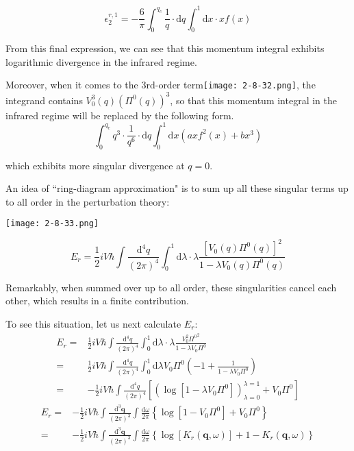 \begin{equation*} \label{Eqs2.8.9.d} \tag{2.8.9.d}
\epsilon_2^{r,1}= -\frac{6}{\pi} \int_0^{q_c} \frac{1}{q} \cdot \mathrm{d} q \int_0^{1} \mathrm{d} x \cdot  x f(x)
\end{equation*}

From this final expression, we can see that this momentum integral exhibits logarithmic divergence in the infrared regime.

Moreover, when it comes to the 3rd-order term\texttt{[image: 2-8-32.png]}, the integrand contains $V_0^3(q) (\Pi^0(q))^3$, so that this momentum integral in the infrared regime will be replaced by the following form.
\begin{equation*} \label{Eqs2.8.9.e} \tag{2.8.9.e}
\int_0^{q_c}q^3 \cdot \frac{1}{q^6} \cdot \mathrm{d}q \int_0^1 \mathrm{d} x \left( a x f^2(x) + bx^3 \right)
\end{equation*}

which exhibits more singular divergence at $q=0$.

An idea of ``ring-diagram approximation" is to sum up all these singular terms up to all order in the perturbation theory:
\begin{center} \label{Fig2.8.33}
\texttt{[image: 2-8-33.png]}
\end{center}
\begin{equation*} \tag{2.8.9}
E_r = \frac{1}{2}i V\hbar \int \frac{\mathrm{d}^4 q}{(2\pi)^4} \int_0^1 \mathrm{d} \lambda \cdot \lambda \frac{[ V_0(q) \Pi^0(q)]^2}{1-\lambda V_0(q) \Pi^0(q)}
\end{equation*}

Remarkably, when summed over up to all order, these singularities cancel each other, which results in a finite contribution.

To see this situation, let us next calculate $E_r$:
\[\begin{split}
E_r =& \frac{1}{2}i V\hbar \int \frac{\mathrm{d}^4 q}{(2\pi)^4} \int_0^1 \mathrm{d} \lambda \cdot \lambda \frac{V_0^2 {\Pi^0}^2}{1-\lambda V_0\Pi^0}\\
=& \frac{1}{2}i V\hbar \int \frac{\mathrm{d}^4 q}{(2\pi)^4} \int_0^1 \mathrm{d} \lambda V_0 \Pi^0\left( -1 + \frac{1}{1-\lambda V_0 \Pi^0} \right)\\
=& - \frac{1}{2}i V\hbar \int \frac{\mathrm{d}^4 q}{(2\pi)^4}\left[\left( \log[1-\lambda V_0 \Pi^0] \right)_{\lambda=0}^{\lambda=1} + V_0 \Pi^0 \right]\end{split}\]
\begin{equation*} \label{Eqs2.8.9'} \tag{2.8.9'} \begin{split}
E_r=& - \frac{1}{2}i V\hbar \int \frac{\mathrm{d}^3 \mathbf{q}}{(2\pi)^3} \int \frac{\mathrm{d} \omega}{2\pi} \left\{ \log[1-V_0 \Pi^0] + V_0 \Pi^0 \right\}\\
=& - \frac{1}{2}i V\hbar \int \frac{\mathrm{d}^3 \mathbf{q}}{(2\pi)^3} \int \frac{\mathrm{d} \omega}{2\pi} \left\{ \log[K_r(\mathbf{q},\omega)] + 1-K_r(\mathbf{q},\omega) \right\}
\end{split}\end{equation*}

